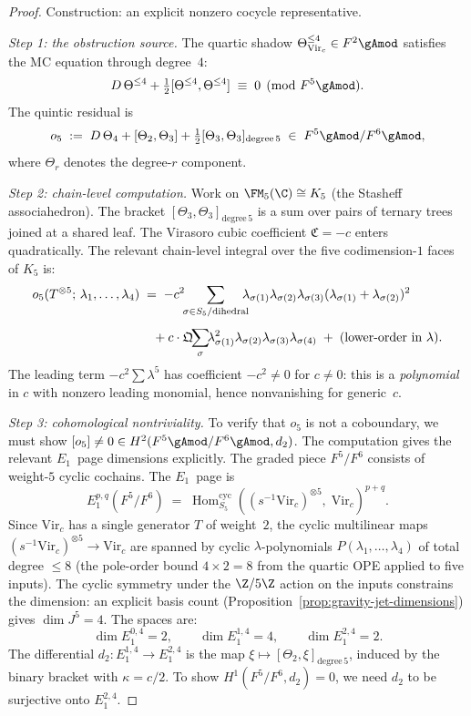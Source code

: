 \begin{proof}
Construction: an explicit nonzero cocycle representative.

\emph{Step 1: the obstruction source.}
The quartic shadow
$\Theta_{\mathrm{Vir}_c}^{\le 4} \in F^2\gAmod$
satisfies the MC equation through degree~$4$:
\[
D\,\Theta^{\le 4}
+ \tfrac{1}{2}[\Theta^{\le 4}, \Theta^{\le 4}]
\;\equiv\; 0 \pmod{F^5\gAmod}.
\]
The quintic residual is
\[
o_5
\;:=\;
D\,\Theta_4 + [\Theta_2, \Theta_3]
+ \tfrac{1}{2}[\Theta_3, \Theta_3]_{\mathrm{degree}\,5}
\;\in\; F^5\gAmod/F^6\gAmod,
\]
where $\Theta_r$ denotes the degree-$r$ component.

\emph{Step 2: chain-level computation.}
Work on $\FM_5(\C) \cong K_5$ (the Stasheff associahedron).
The bracket $[\Theta_3, \Theta_3]_{\mathrm{degree}\,5}$ is a
sum over pairs of ternary trees joined at a shared leaf.
The Virasoro cubic coefficient $\mathfrak{C} = -c$ enters
quadratically. The relevant chain-level integral over the
five codimension-$1$ faces of $K_5$ is:
\begin{align}
o_5(T^{\otimes 5};\,\lambda_1,\ldots,\lambda_4)
&\;=\;
-c^2\!\!\sum_{\sigma \in S_5/\text{dihedral}}
\!\!\!\!
\lambda_{\sigma(1)}\lambda_{\sigma(2)}\lambda_{\sigma(3)}
(\lambda_{\sigma(1)} + \lambda_{\sigma(2)})^2
\notag\\[4pt]
&\quad
+ c \cdot \mathfrak{Q}\!\!\sum_{\sigma}\!\!
\lambda_{\sigma(1)}^2\lambda_{\sigma(2)}\lambda_{\sigma(3)}
\lambda_{\sigma(4)}
\;+\; \text{(lower-order in $\lambda$)}.
\label{eq:gravity-o5-leading}
\end{align}
The leading term $-c^2\sum\lambda^5$ has coefficient
$-c^2 \ne 0$ for $c \ne 0$: this is a
\emph{polynomial} in $c$ with nonzero leading monomial, hence
nonvanishing for generic~$c$.

\emph{Step 3: cohomological nontriviality.}
To verify that $o_5$ is not a coboundary, we must show
$[o_5] \ne 0 \in H^2(F^5\gAmod/F^6\gAmod, d_2)$.
The computation gives the relevant $E_1$~page dimensions explicitly.
The graded piece $F^5/F^6$ consists of weight-$5$ cyclic
cochains. The $E_1$~page is
\[
E_1^{p,q}(F^5/F^6)
\;=\;
\operatorname{Hom}_{S_5}^{\mathrm{cyc}}\!
\left(
 (s^{-1}\mathrm{Vir}_c)^{\otimes 5},\;
 \mathrm{Vir}_c
\right)^{p+q}.
\]
Since $\mathrm{Vir}_c$ has a single generator $T$ of weight~$2$,
the cyclic multilinear maps
$(s^{-1}\mathrm{Vir}_c)^{\otimes 5} \to \mathrm{Vir}_c$ are
spanned by cyclic $\lambda$-polynomials
$P(\lambda_1, \ldots, \lambda_4)$ of total degree $\le 8$
(the pole-order bound $4 \times 2 = 8$ from the quartic OPE
applied to five inputs). The cyclic symmetry under the
$\Z/5\Z$ action on the inputs constrains the dimension:
an explicit basis count
(Proposition~\ref{prop:gravity-jet-dimensions}) gives
$\dim J^5 = 4$. The spaces are:
\[
\dim E_1^{0,4} = 2, \qquad
\dim E_1^{1,4} = 4, \qquad
\dim E_1^{2,4} = 2.
\]
The differential $d_2 \colon E_1^{1,4} \to E_1^{2,4}$ is the
map $\xi \mapsto [\Theta_2, \xi]_{\mathrm{degree}\,5}$, induced
by the binary bracket with $\kappa = c/2$. To show
$H^1(F^5/F^6, d_2) = 0$, we need $d_2$ to be surjective
onto $E_1^{2,4}$.


\end{proof}
